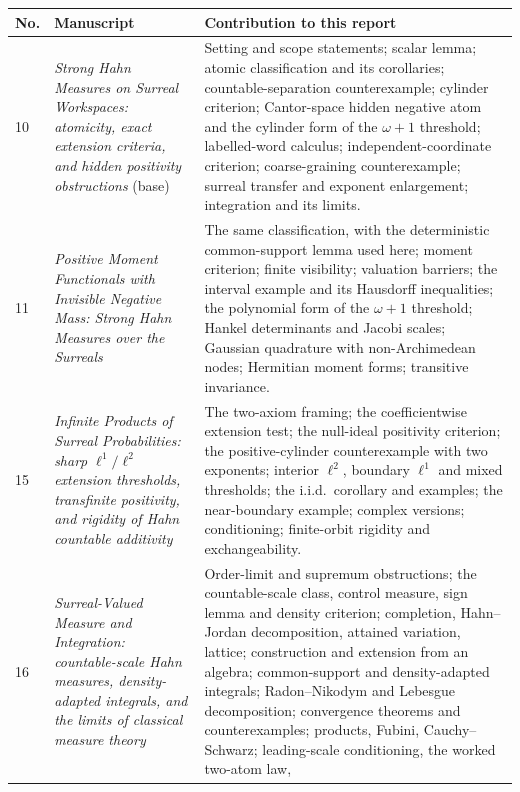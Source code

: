 \documentclass[11pt]{article}
\numberwithin{equation}{section}
\theoremstyle{definition}
\theoremstyle{remark}
\begin{document}
\begin{center}
\small
\begin{tabularx}{\textwidth}{@{}p{}>{\raggedright\arraybackslash}p{}>{\raggedright\arraybackslash}X@{}}
\toprule
No. & Manuscript & Contribution to this report\\
\midrule
10 & \emph{Strong Hahn Measures on Surreal Workspaces: atomicity, exact
extension criteria, and hidden positivity obstructions} (base) &
Setting and scope statements; scalar lemma; atomic classification and its
corollaries; countable-separation counterexample; cylinder criterion;
Cantor-space hidden negative atom and the cylinder form of the $\omega+1$
threshold; labelled-word calculus; independent-coordinate criterion;
coarse-graining counterexample; surreal transfer and exponent enlargement;
integration and its limits.\\[3pt]
11 & \emph{Positive Moment Functionals with Invisible Negative Mass: Strong
Hahn Measures over the Surreals} &
The same classification, with the deterministic common-support lemma used
here; moment criterion; finite visibility; valuation barriers; the interval
example and its Hausdorff inequalities; the polynomial form of the
$\omega+1$ threshold; Hankel determinants and Jacobi scales; Gaussian
quadrature with non-Archimedean nodes; Hermitian moment forms; transitive
invariance.\\[3pt]
15 & \emph{Infinite Products of Surreal Probabilities: sharp $\ell^1/\ell^2$
extension thresholds, transfinite positivity, and rigidity of Hahn countable
additivity} &
The two-axiom framing; the coefficientwise extension test; the null-ideal
positivity criterion; the positive-cylinder counterexample with two
exponents; interior $\ell^2$, boundary $\ell^1$ and mixed thresholds; the
i.i.d.\ corollary and examples; the near-boundary example; complex versions;
conditioning; finite-orbit rigidity and exchangeability.\\[3pt]
16 & \emph{Surreal-Valued Measure and Integration: countable-scale Hahn
measures, density-adapted integrals, and the limits of classical measure
theory} &
Order-limit and supremum obstructions; the countable-scale class, control
measure, sign lemma and density criterion; completion, Hahn--Jordan
decomposition, attained variation, lattice; construction and extension from an
algebra; common-support and density-adapted integrals; Radon--Nikodym and
Lebesgue decomposition; convergence theorems and counterexamples; products,
Fubini, Cauchy--Schwarz; leading-scale conditioning, the worked two-atom law,

\end{tabularx}
\end{center}
\end{document}
